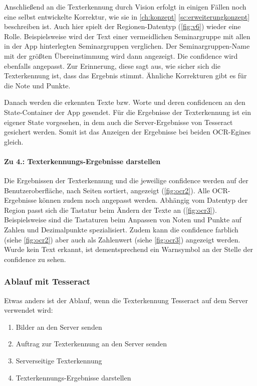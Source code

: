 \documentclass[notables, nomenclature, oneside, 150]{HSMW-Thesis}
\begin{document}
				Anschließend an die Texterkennung durch Vision erfolgt in einigen Fällen noch eine selbst entwickelte Korrektur, wie sie in \autoref{ch:konzept} \autoref{sc:erweiterungkonzept} beschreiben ist. Auch hier spielt der Regionen-Datentyp (\ref{fig:v6}) wieder eine Rolle. Beispielsweise wird der Text einer vermeidlichen Seminargruppe mit allen in der App hinterlegten Seminargruppen verglichen. Der Seminargruppen-Name mit der größten Übereinstimmung wird dann angezeigt. Die confidence wird ebenfalls angepasst. Zur Erinnerung, diese sagt aus, wie sicher sich die Texterkennung ist, dass das Ergebnis stimmt. Ähnliche Korrekturen gibt es für die Note und Punkte.
				
				Danach werden die erkennten Texte bzw. Worte und deren confidencen an den State-Container der App gesendet. Für die Ergebnisse der Texterkennung ist ein eigener State vorgesehen, in dem auch die Server-Ergebnisse von Tesseract gesichert werden. Somit ist das Anzeigen der Ergebnisse bei beiden OCR-Egines gleich.  
				
				\paragraph*{Zu 4.: Texterkennungs-Ergebnisse darstellen}
				Die Ergebnissen der Texterkennung und die jeweilige confidence werden auf der Benutzeroberfläche, nach Seiten sortiert, angezeigt (\ref{fig:ocr2}). Alle OCR-Ergebnisse können zudem noch angepasst werden. Abhängig vom Datentyp der Region passt sich die Tastatur beim Ändern der Texte an (\ref{fig:ocr3}). Beispielsweise sind die Tastaturen beim Anpassen von Noten und Punkte auf Zahlen und Dezimalpunkte spezialisiert. Zudem kann die confidence farblich (siehe \autoref{fig:ocr2}) aber auch als Zahlenwert (siehe \autoref{fig:ocr3}) angezeigt werden. Wurde kein Text erkannt, ist dementsprechend ein Warnsymbol an der Stelle der confidence zu sehen.    
 
			\subsubsection*{Ablauf mit Tesseract}
				Etwas anders ist der Ablauf, wenn die Texterkennung Tesseract auf dem Server verwendet wird:
				\begin{enumerate}
					\item Bilder an den Server senden
					\item Auftrag zur Texterkennung an den Server senden
					\item Serverseitige Texterkennung
					\item Texterkennungs-Ergebnisse darstellen
				\end{enumerate}
				
\end{document}
